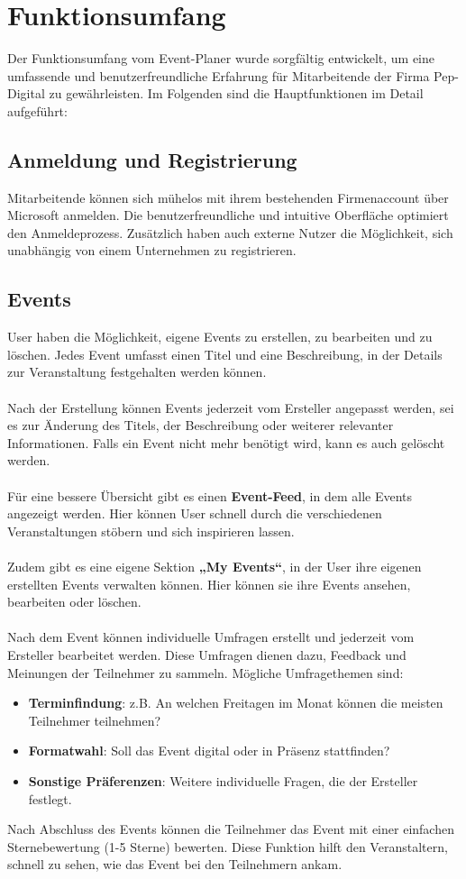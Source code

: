 \documentclass[a4paper,12pt]{article}
\begin{document}
\section{Funktionsumfang}
Der Funktionsumfang vom Event-Planer wurde sorgfältig entwickelt, um eine umfassende und benutzerfreundliche Erfahrung für Mitarbeitende der Firma Pep-Digital zu gewährleisten. Im Folgenden sind die Hauptfunktionen im Detail aufgeführt:
\subsection{Anmeldung und Registrierung}
 Mitarbeitende können sich mühelos mit ihrem bestehenden Firmenaccount über Microsoft anmelden. Die benutzerfreundliche und intuitive Oberfläche optimiert den Anmeldeprozess. Zusätzlich haben auch externe Nutzer die Möglichkeit, sich unabhängig von einem Unternehmen zu registrieren.
\subsection{Events}
User haben die Möglichkeit, eigene Events zu erstellen, zu bearbeiten und zu löschen. Jedes Event umfasst einen Titel und eine Beschreibung, in der Details zur Veranstaltung festgehalten werden können.\\\\
Nach der Erstellung können Events jederzeit vom Ersteller angepasst werden, sei es zur Änderung des Titels, der Beschreibung oder weiterer relevanter Informationen. Falls ein Event nicht mehr benötigt wird, kann es auch gelöscht werden.\\\\
Für eine bessere Übersicht gibt es einen \textbf{Event-Feed}, in dem alle Events angezeigt werden. Hier können User schnell durch die verschiedenen Veranstaltungen stöbern und sich inspirieren lassen.\\\\
Zudem gibt es eine eigene Sektion \textbf{„My Events“}, in der User ihre eigenen erstellten Events verwalten können. Hier können sie ihre Events ansehen, bearbeiten oder löschen.\\\\
Nach dem Event können individuelle Umfragen erstellt und jederzeit vom Ersteller bearbeitet werden. Diese Umfragen dienen dazu, Feedback und Meinungen der Teilnehmer zu sammeln. Mögliche Umfragethemen sind:
\begin{itemize}
    \item \textbf{Terminfindung}: z.B. An welchen Freitagen im Monat können die meisten Teilnehmer teilnehmen?
    \item \textbf{Formatwahl}: Soll das Event digital oder in Präsenz stattfinden?
    \item \textbf{Sonstige Präferenzen}: Weitere individuelle Fragen, die der Ersteller festlegt.
\end{itemize}
Nach Abschluss des Events können die Teilnehmer das Event mit einer einfachen Sternebewertung (1-5 Sterne) bewerten. Diese Funktion hilft den Veranstaltern, schnell zu sehen, wie das Event bei den Teilnehmern ankam.
\newpage
\end{document}
